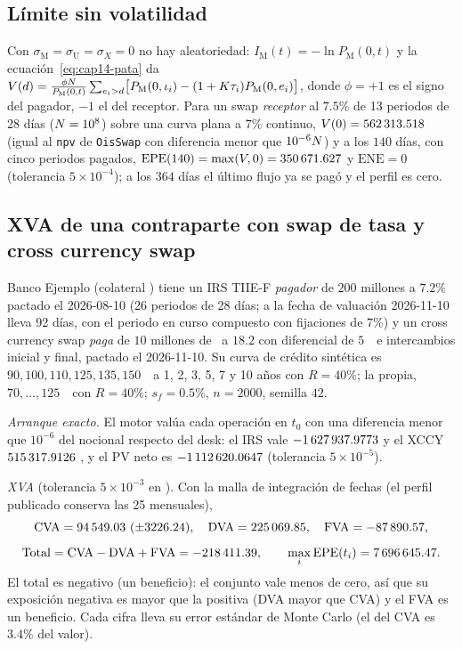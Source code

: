 \subsection{Límite sin volatilidad}\label{sec:cap14-ej-sinvol}

Con $\sigma_{\mathrm M}=\sigma_{\mathrm U}=\sigma_X=0$ no hay aleatoriedad: $I_{\mathrm M}(t)=-\ln P_{\mathrm M}(0,t)$ y la
ecuación~\eqref{eq:cap14-pata} da $V(d)=\frac{\phi\Nom}{P_{\mathrm M}(0,t)}\sum_{e_i>d}\bigl[P_{\mathrm M}(0,\iota_i)-(1+\K\tau_i)P_{\mathrm M}(0,e_i)\bigr]$,
donde $\phi=+1$ es el signo del pagador, $-1$ el del receptor. Para un swap \emph{receptor} al $7.5\%$ de 13 periodos de 28 días ($\Nom=10^{8}$)
sobre una curva plana a $7\%$ continuo, $V(0)=\verif{cap14-sinvol-valor-inicial}{562313.518}$ (igual al \texttt{npv} de \texttt{OisSwap}
con diferencia menor que $10^{-6}\Nom$) y a los $140$ días, con cinco periodos pagados,
$\mathrm{EPE}(140)=\max(V,0)=\verif{cap14-sinvol-epe}{350671.627}$ y $\mathrm{ENE}=0$ (tolerancia $5\times10^{-4}$); a
los $364$ días el último flujo ya se pagó y el perfil es cero.

\subsection{XVA de una contraparte con swap de tasa y cross currency swap}\label{sec:cap14-ej-desk}

Banco Ejemplo (colateral \MXN) tiene un IRS TIIE-F \emph{pagador} de $200$ millones a $7.2\%$ pactado el 2026-08-10
(26 periodos de 28 días; a la fecha de valuación 2026-11-10 lleva 92 días, con el periodo en curso compuesto con
fijaciones de $7\%$) y un cross currency swap \emph{paga \USD} de $10$ millones de \USD\ a $18.2$ con diferencial de
$5$~\pb\ e intercambios inicial y final, pactado el 2026-11-10. Su curva de crédito sintética es
$90,100,110,125,135,150$~\pb\ a 1, 2, 3, 5, 7 y 10 años con $R=40\%$; la propia, $70,\dots,125$~\pb\ con $R=40\%$; $s_f=0.5\%$,
$n=2000$, semilla $42$.

\emph{Arranque exacto.} El motor valúa cada operación en $t_0$ con una diferencia menor que $10^{-6}$ del nocional
respecto del desk: el IRS vale $\verif{cap14-desk-pv-irs}{-1627937.9773}$ y el XCCY
$\verif{cap14-desk-pv-xccy}{515317.9126}$ \MXN, y el PV neto es $\verif{cap14-desk-pv-neto}{-1112620.0647}$ (tolerancia
$5\times10^{-5}$).

\emph{XVA} (tolerancia $5\times10^{-3}$ en \MXN). Con la malla de integración de  fechas
(el perfil publicado conserva las 25 mensuales),
\[
  \mathrm{CVA}=\verif{cap14-desk-cva}{94549.03}\ (\pm\verif{cap14-desk-cva-ee}{3226.24}),\quad
  \mathrm{DVA}=\verif{cap14-desk-dva}{225069.85},\quad
  \mathrm{FVA}=\verif{cap14-desk-fva}{-87890.57},
\]
\[
  \mathrm{Total}=\mathrm{CVA}-\mathrm{DVA}+\mathrm{FVA}=\verif{cap14-desk-total}{-218411.39},\qquad
  \max_i\mathrm{EPE}(t_i)=\verif{cap14-desk-epe-max}{7696645.47}.
\]
El total es negativo (un beneficio): el conjunto vale menos de cero, así que su exposición negativa es mayor que la
positiva (DVA mayor que CVA) y el FVA es un beneficio. Cada cifra lleva su error estándar de Monte Carlo (el del CVA es $3.4\%$ del valor).

